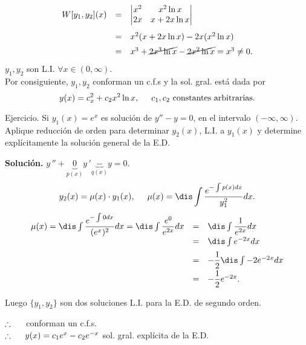 \documentclass{beamer}
\begin{document}
\begin{frame}[t]
	\begin{exampleblock}{}
		\[
			\begin{array}{rcl}
				W[y_1,y_2] (x) & = & \begin{vmatrix}
					x^2 & x^2 \ln x \\
					2x & x+2x \ln x 
				\end{vmatrix} \\[5mm]
				& = & x^2(x+ 2x \ln x) - 2x(x^2 \ln x) \\[2mm]
				& = & x^3+ \cancel{2x^3 \ln x} - \cancel{2x^2 \ln x} = x^3 \ne 0.
			\end{array}
		\]
		\(y_1,y_2\) son L.I. \(\forall x \in (0, \infty)\). \\[2mm]
		Por consiguiente, \(y_1,y_2\) conforman un c.f.s y la sol. gral. está dada por
		\[
			y(x) = c_x^2+c_2x^2 \ln x, \hspace{5mm} c_1,c_2 \mbox{ constantes arbitrarias}.
		\]
	\end{exampleblock}
\end{frame}

\begin{frame}[t]
	\begin{alertblock}{Ejercicio.}
		Si \(y_1(x) = e^x\) es solución de \(y'' -y=0\), en el intervalo \((- \infty , \infty)\). Aplique reducción de orden para determinar \(y_2(x)\), L.I. a \(y_1(x)\) y determine explícitamente la solución general de la E.D.
	\end{alertblock}
	\begin{alertblock}{}
		\textbf{Solución.} \(y\,'' + \underbrace{0} _{p(x)} y\,' \underbrace{-} _{q(x)} y =0\). \vspace{-5mm}
		\[
			y_2(x) = \mu (x) \cdot y_1(x), \hspace{5mm} \mu (x) = \dis\int \dfrac{e^{-\int p(x) dx}}{y_1^2} dx.
		\]
		\[
			\begin{array}{rcl}
				\mu (x) = \dis\int \dfrac{e^{-\int 0 dx}}{(e^x) ^2} dx = \dis\int \dfrac{e^0}{e^{2x}} dx & = & \dis\int \dfrac{1}{e^{2x}} dx \\[2mm]
				& = & \dis\int e^{-2x} dx \\[2mm]
				& = & - \dfrac{1}{2} \dis\int -2e^{-2x} dx \\[2mm]
				& = & - \dfrac{1}{2} e^{-2x} .
			\end{array}
		\]
	\end{alertblock}
\end{frame}

\begin{frame}[t]
	\begin{alertblock}{}
		Luego \(\{y_1,y_2\}\) son dos soluciones L.I. para la E.D. de segundo orden.
		\begin{center}
			\(\therefore \hspace{5mm}\) conforman un c.f.s. \\[2mm]
			\color{red} \underline{\color{black} \(\therefore \hspace{5mm} y(x) = c_1e^x-c_2e^{-x}\)} sol. gral. explícita de la E.D. 
		\end{center}
	\end{alertblock}
\end{frame}
\end{document}
